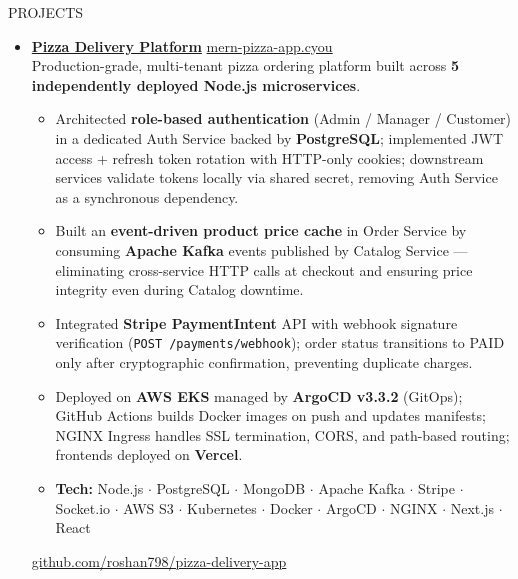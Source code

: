 \documentclass{resume}
\begin{document}
\begin{rSection}{PROJECTS}
\begin{itemize}



\item \href{https://github.com/roshan798/pizza-delivery-app}{\textbf{Pizza Delivery Platform}}
  \hfill \href{https://mern-pizza-app.cyou}{mern-pizza-app.cyou}\\
  Production-grade, multi-tenant pizza ordering platform built across
  \textbf{5 independently deployed Node.js microservices}.
  \begin{itemize}
    \itemsep -3pt
    \item Architected \textbf{role-based authentication} (Admin / Manager / Customer)
          in a dedicated Auth Service backed by \textbf{PostgreSQL};
          implemented JWT access + refresh token rotation with HTTP-only cookies;
          downstream services validate tokens locally via shared secret,
          removing Auth Service as a synchronous dependency.
    \item Built an \textbf{event-driven product price cache} in Order Service by
          consuming \textbf{Apache Kafka} events
          published by Catalog Service --- eliminating cross-service HTTP calls at
          checkout and ensuring price integrity even during Catalog downtime.
    \item Integrated \textbf{Stripe PaymentIntent} API with webhook signature
          verification (\texttt{POST /payments/webhook}); order status transitions
          to PAID only after cryptographic confirmation, preventing duplicate charges.
    \item Deployed on \textbf{AWS EKS} managed by \textbf{ArgoCD v3.3.2} (GitOps);
          GitHub Actions builds Docker images on push and updates manifests;
          NGINX Ingress handles SSL termination, CORS, and path-based routing;
          frontends deployed on \textbf{Vercel}.
    \item \textbf{Tech:} Node.js \(\cdot\) PostgreSQL \(\cdot\) MongoDB \(\cdot\)
          Apache Kafka \(\cdot\) Stripe \(\cdot\) Socket.io \(\cdot\) AWS S3 \(\cdot\)
          Kubernetes \(\cdot\) Docker \(\cdot\) ArgoCD \(\cdot\) NGINX \(\cdot\)
          Next.js \(\cdot\) React
  \end{itemize}
  \href{https://github.com/roshan798/pizza-delivery-app}{github.com/roshan798/pizza-delivery-app}


\end{itemize}
\end{rSection}
\end{document}

